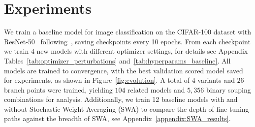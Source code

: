 \section{Experiments}\label{sec:experiments}

We train a baseline model for image classification on the CIFAR-100 dataset with ResNet-50~\cite{resnet50} following~\cite{cifar100params}, saving checkpoints every 10 epochs. From each checkpoint we train $4$ new models with different optimizer settings, for details see Appendix Tables~\ref{tab:optimizer_perturbations} and~\ref{tab:hyperparams_baseline}. All models are trained to convergence, with the best validation scored model saved for experiments, as shown in Figure~\ref{fig:evolution}. A total of $4$ variants and $26$ branch points were trained, yielding $104$ related models and $5,356$ binary souping combinations for analysis. Additionally, we train 12 baseline models with and without Stochastic Weight Averaging (SWA) to compare the depth of fine-tuning paths against the breadth of SWA, see Appendix~\ref{appendix:SWA_results}.






